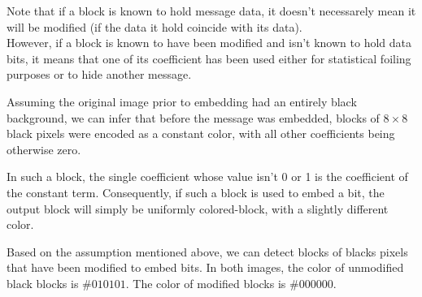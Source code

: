\documentclass{article}
\begin{document}
Note that if a block is known to hold message data, it doesn't necessarely mean it will be modified (if the data it hold coincide with its data). \\

However, if a block is known to have been modified and isn't known to hold data bits, it means that one of its coefficient has been used either for statistical foiling purposes or to hide another message.

Assuming the original image prior to embedding had an entirely black background, we can infer that before the message was embedded, blocks of $8 \times 8$ black pixels were encoded as a constant color, with all other coefficients being otherwise zero.

In such a block, the single coefficient whose value isn't 0 or 1 is the coefficient of the constant term. Consequently, if such a block is used to embed a bit, the output block will simply be uniformly colored-block, with a slightly different color.

Based on the assumption mentioned above, we can detect blocks of blacks pixels that have been modified to embed bits. In both images, the color of unmodified black blocks is $\#010101$. The color of modified blocks is $\#000000$.
\end{document}

